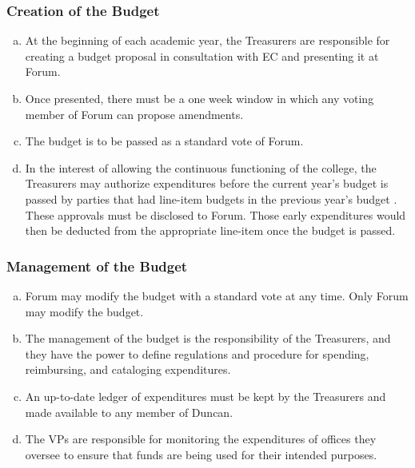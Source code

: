 \documentclass[USletter,12pt]{article}
\begin{document}
\begin{enumerate}[(a)]
\subsubsection{Creation of the Budget}
\begin{enumerate}[(a)]
\item At the beginning of each academic year, the Treasurers are responsible for creating a budget proposal in consultation with EC and presenting it at Forum.  
\item Once presented, there must be a one week window in which any voting member of Forum can propose amendments.
\item The budget is to be passed as a standard vote of Forum.
\item In the interest of allowing the continuous functioning of the college, the Treasurers may authorize expenditures before the current year's budget is passed by parties that had line-item budgets in the previous year's budget .  These approvals must be disclosed to Forum.  Those early expenditures would then be deducted from the appropriate line-item once the budget is passed.
\end{enumerate}

\subsubsection{Management of the Budget}
\begin{enumerate}[(a)]
\item Forum may modify the budget with a standard vote at any time.  Only Forum may modify the budget.
\item The management of the budget is the responsibility of the Treasurers, and they have the power to define regulations and procedure for spending, reimbursing, and cataloging expenditures.
\item An up-to-date ledger of expenditures must be kept by the Treasurers and made available to any member of Duncan.
\item The VPs are responsible for monitoring the expenditures of offices they oversee to ensure that funds are being used for their intended purposes.
\end{enumerate}


\end{enumerate}
\end{document}
